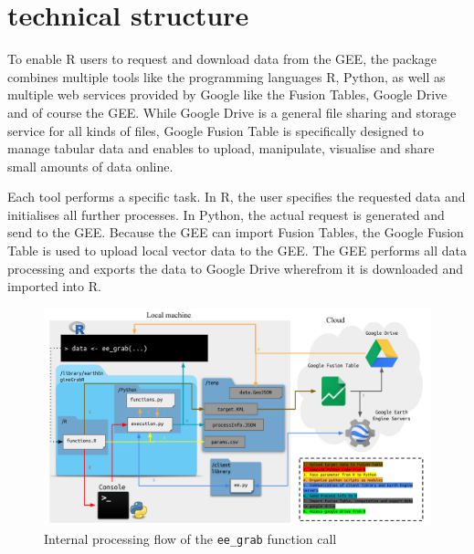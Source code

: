 \section{technical structure}

To enable R users to request and download data from the GEE, the package combines multiple tools like the programming languages R, Python, as well as multiple web services provided by Google like the Fusion Tables, Google Drive and of course the GEE. While Google Drive is a general file sharing and storage service for all kinds of files, Google Fusion Table is specifically designed to manage tabular data and enables to upload, manipulate, visualise and share small amounts of data online.

Each tool performs a specific task. In R, the user specifies the requested data and initialises all further processes. In Python, the actual request is generated and send to the GEE. Because the GEE can import Fusion Tables, the Google Fusion Table is used to upload local vector data to the GEE. The GEE performs all data processing and exports the data to Google Drive wherefrom it is downloaded and imported into R. 

\begin{center}
	
	\begin{figure}[h]
		\begin{center}
			\includegraphics[width=15cm]{images/processin_folw.pdf}
			\caption{Internal processing flow of the \texttt{ee\_grab} function call}
			\label{processingFlow}
			
		\end{center}
	\end{figure}
\end{center}

